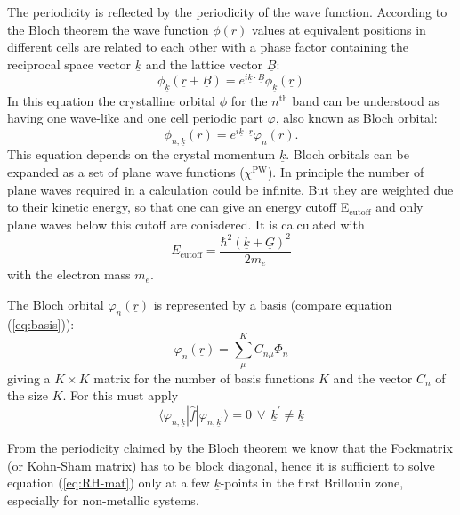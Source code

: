 \documentclass[11pt,DIV=13,BCOR=5mm,a4paper,headinclude]{scrbook}
\renewcommand{\vec}[1]{\underline{#1}}
\begin{document}
The periodicity is reflected by the periodicity of the wave function.
According to the Bloch theorem\cite{Bloch1928} the wave function $\phi(\vec{r})$ values at equivalent positions in different cells are related to each other with a phase factor containing the reciprocal space vector $\vec{k}$ and the lattice vector $\vec{B}$:
\begin{equation}
 \phi_{\vec{k}}(\vec{r} + \vec{B})=e^{i\vec{k}\cdot\vec{B}}\phi_{\vec{k}}(\vec{r})
\end{equation}
In this equation the crystalline orbital $\phi$ for the $n^\textrm{th}$ band can be understood as having one wave-like and one cell periodic part $\varphi$, also known as Bloch orbital:
\begin{equation}
 \phi_{n,\vec{k}}(\vec{r})=e^{i\vec{k}\cdot\vec{r}}\varphi_n(\vec{r}).
\end{equation}
This equation depends on the crystal momentum $\vec{k}$.
Bloch orbitals can be expanded as a set of plane wave functions ($\chi^\textrm{PW}$).
In principle the number of plane waves required in a calculation could be infinite.
But they are weighted due to their kinetic energy, so that one can give an energy cutoff E$_\textrm{cutoff}$ and only plane waves below this cutoff are conisdered.
It is calculated with
\begin{equation}
 E_\textrm{cutoff}=\frac{\hbar^2(\vec{k}+\vec{G})^2}{2m_e}
\end{equation}
with the electron mass $m_e$.

The Bloch orbital $\varphi_{n}(\vec{r})$ is represented by a basis (compare equation (\ref{eq:basis})):
\begin{equation}
 \varphi_n(\vec{r})=\sum_\mu^K C_{n\mu}\Phi_n
\end{equation}
giving a $K\times K$ matrix for the number of basis functions $K$ and the vector $C_n$ of the size $K$.
For this must apply
\begin{equation}
 \langle\varphi_{n,\vec{k}}|\hat{f}|\varphi_{n,\vec{k}^\prime}\rangle=0 ~~ \forall ~~\vec{k}^\prime\neq \vec{k}
\end{equation}

From the periodicity claimed by the Bloch theorem we know that the Fockmatrix (or Kohn-Sham matrix) has to be block diagonal, hence it is sufficient to solve equation (\ref{eq:RH-mat}) only at a few $\vec{k}$-points in the first Brillouin zone, especially for non-metallic systems\cite{monkhorst}.
\end{document}
